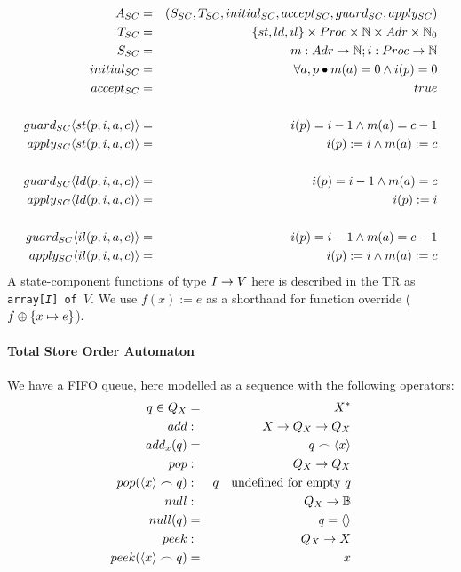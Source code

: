 \begin{eqnarray*}
   A_{SC} &=& (S_{SC},T_{SC},initial_{SC},accept_{SC},guard_{SC},apply_{SC})
\\ T_{SC} &=& \{{st,ld,il}\} \times Proc \times \mathbb{N} \times Adr \times \mathbb{N}_0
\\ S_{SC} &=& m : Adr \mathrel{\rightarrow} \mathbb{N} ;
              i : Proc \mathrel{\rightarrow} \mathbb{N}
\\ initial_{SC} &=& \forall a,p \bullet m(a)=0 \land i(p)=0
\\ accept_{SC} &=& true
\\
\\ guard_{SC}\langle{st(p,i,a,c)}\rangle &=& i(p)=i-1 \land m(a)=c-1
\\ apply_{SC}\langle{st(p,i,a,c)}\rangle &=& i(p):=i \land m(a):=c
\\
\\ guard_{SC}\langle{ld(p,i,a,c)}\rangle &=& i(p)=i-1 \land m(a)=c
\\ apply_{SC}\langle{ld(p,i,a,c)}\rangle &=& i(p):=i
\\
\\ guard_{SC}\langle{il(p,i,a,c)}\rangle &=& i(p)=i-1 \land m(a)=c-1
\\ apply_{SC}\langle{il(p,i,a,c)}\rangle &=& i(p):=i \land m(a):=c
\end{eqnarray*}
A state-component functions of type $I \mathrel{\rightarrow} V$ here
is described in the TR as \texttt{array[\textit{I}] of }$V$.
We use $f(x):=e$ as a shorthand
for function override ($f \oplus \{{x \mapsto e}\}$).

\paragraph{Total Store Order Automaton}

We have a FIFO queue, here modelled as a sequence with the following operators:
\begin{eqnarray}
   q \in Q_X &=& X^*
\\ add &:& X \mathrel{\rightarrow} Q_X \mathrel{\rightarrow} Q_X
\\ add_x(q) &=& q \frown \langle{x}\rangle
\\ pop &:& Q_X \mathrel{\rightarrow} Q_X
\\ pop(\langle{x}\rangle \frown q) &:& q \quad \mbox{undefined for empty } q
\\ null &:& Q_X \mathrel{\rightarrow} \mathbb{B}
\\ null(q) &=& q = \langle{}\rangle
\\ peek &:& Q_X \mathrel{\rightarrow} X
\\ peek(\langle{x}\rangle \frown q) &=& x
\end{eqnarray}

